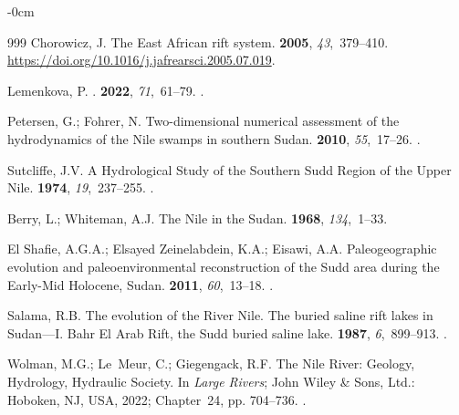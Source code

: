 \documentclass[analytics,article,accept,pdftex,moreauthors]{Definitions/mdpi}
\begin{document}
\begin{adjustwidth}{-\extralength}{0cm}
\begin{thebibliography}{999}
Chorowicz, J.
\newblock The East African rift system.
 {\bf 2005}, {\em
  43},~379--410.
\newblock %
  {\url{https://doi.org/10.1016/j.jafrearsci.2005.07.019}}.

Lemenkova, P.
.
 {\bf 2022}, {\em
  71},~61--79.
.

Petersen, G.; Fohrer, N.
\newblock Two-dimensional numerical assessment of the hydrodynamics of the Nile
  swamps in southern Sudan.
 {\bf 2010}, {\em 55},~17--26.
.

Sutcliffe, J.V.
\newblock A Hydrological Study of the Southern Sudd Region of the Upper Nile.
 {\bf 1974}, {\em 19},~237--255.
.

Berry, L.; Whiteman, A.J.
\newblock The Nile in the Sudan.
 {\bf 1968}, {\em 134},~1--33.

{El Shafie}, A.G.A.; {Elsayed Zeinelabdein}, K.A.; Eisawi, A.A.
\newblock Paleogeographic evolution and paleoenvironmental reconstruction of
  the Sudd area during the Early-Mid Holocene, Sudan.
 {\bf 2011}, {\em 60},~13--18.
.

Salama, R.B.
\newblock The evolution of the River Nile. The buried saline rift lakes in
  Sudan---I. Bahr El Arab Rift, the Sudd buried saline lake.
 {\bf 1987}, {\em
  6},~899--913.
.

Wolman, M.G.; Le~Meur, C.; Giegengack, R.F. The Nile River: Geology,
  Hydrology, Hydraulic Society.
\newblock In {\em Large Rivers}; John Wiley \& Sons, Ltd.: Hoboken, NJ, USA, %
  2022; Chapter~24,
  pp. 704--736.
.


\end{thebibliography}
\end{adjustwidth}
\end{document}

